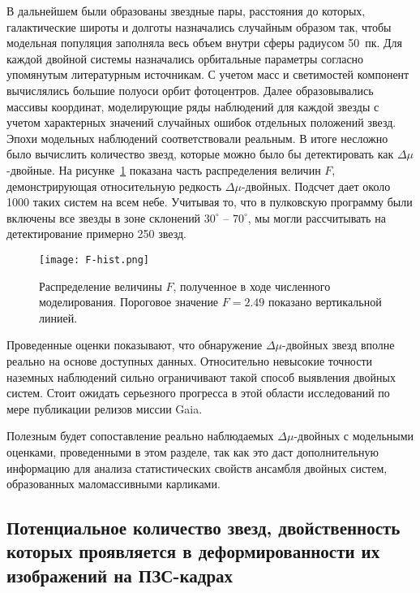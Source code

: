 В дальнейшем были образованы звездные пары, расстояния до которых, галактические широты и долготы назначались случайным образом так, чтобы модельная популяция заполняла весь объем внутри сферы радиусом 50~пк. Для каждой двойной системы назначались орбитальные параметры согласно упомянутым литературным источникам. С учетом масс и светимостей компонент вычислялись большие полуоси орбит фотоцентров. Далее образовывались массивы координат, моделирующие ряды наблюдений для каждой звезды с учетом характерных значений случайных ошибок отдельных положений звезд. Эпохи модельных наблюдений соответствовали реальным. В итоге несложно было вычислить количество звезд, которые можно было бы детектировать как $\Delta\mu$-двойные.  На рисунке~\ref{fig:F-hist} показана часть распределения величин $F$, демонстрирующая относительную редкость $\Delta\mu$-двойных. Подсчет дает около 1000 таких систем на всем небе. Учитывая то, что в пулковскую программу были включены все звезды в зоне склонений	$30^\circ$ -- $70^\circ$, мы могли рассчитывать на детектирование примерно 250 звезд. 

\begin{figure}[pt]\label{fig:F-hist}
\centering
\texttt{[image: F-hist.png]}
\caption{Распределение величины $F$, полученное в ходе численного моделирования. Пороговое значение $F=2.49$ показано вертикальной линией. }
\end{figure}

Проведенные оценки показывают, что обнаружение $\Delta\mu$-двойных звезд вполне реально на основе доступных данных. Относительно невысокие точности наземных наблюдений сильно  ограничивают такой способ выявления двойных систем. Стоит ожидать серьезного прогресса в этой области исследований по мере публикации релизов миссии Gaia.

Полезным будет сопоставление реально наблюдаемых  $\Delta\mu$-двойных с модельными оценками, проведенными в этом разделе, так как это даст дополнительную информацию для анализа статистических свойств ансамбля двойных систем, образованных маломассивными карликами.

\subsection{Потенциальное количество звезд, двойственность которых проявляется в деформированности их изображений на ПЗС-кадрах}\label{subsec:ch1/sect2/sub3}

